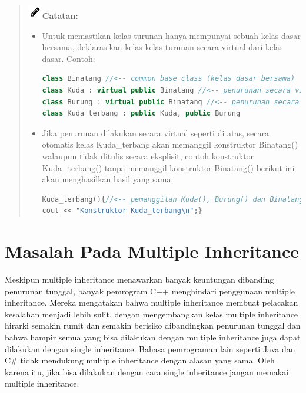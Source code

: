 \begin{quotation}
\includegraphics{../manuscript/images/pencil}\textbf{Catatan:}
	
\begin{itemize}
\item Untuk memastikan kelas turunan hanya mempunyai sebuah kelas dasar bersama,
deklarasikan kelas-kelas turunan secara virtual dari kelas dasar. Contoh:

\begin{lstlisting}[language=c++, numbers=none]
class Binatang //<-- common base class (kelas dasar bersama)
class Kuda : virtual public Binatang //<-- penurunan secara virtual
class Burung : virtual public Binatang //<-- penurunan secara virtual
class Kuda_terbang : public Kuda, public Burung
\end{lstlisting}

\item Jika penurunan dilakukan secara virtual seperti di atas, secara otomatis kelas
Kuda\_terbang akan memanggil konstruktor Binatang() walaupun tidak ditulis
secara eksplisit, contoh konstruktor Kuda\_terbang() tanpa memanggil konstruktor
Binatang() berikut ini akan menghasilkan hasil yang sama:
		
\begin{lstlisting}[language=c++, numbers=none]
Kuda_terbang(){//<-- pemanggilan Kuda(), Burung() dan Binatang() implisit
cout << "Konstruktor Kuda_terbang\n";}
\end{lstlisting}
\end{itemize}

\end{quotation}




\section{Masalah Pada Multiple
Inheritance}\label{masalah-pada-multiple-inheritance}

Meskipun multiple inheritance menawarkan banyak keuntungan dibanding
penurunan tunggal, banyak pemrogram C++ menghindari penggunaan multiple
inheritance. Mereka mengatakan bahwa multiple inheritance membuat
pelacakan kesalahan menjadi lebih sulit, dengan mengembangkan kelas
multiple inheritance hirarki semakin rumit dan semakin berisiko
dibandingkan penurunan tunggal dan bahwa hampir semua yang bisa
dilakukan dengan multiple inheritance juga dapat dilakukan dengan single
inheritance. Bahasa pemrograman lain seperti Java dan C\# tidak
mendukung multiple inheritance dengan alasan yang sama. Oleh karena itu,
jika bisa dilakukan dengan cara single inheritance jangan memakai
multiple inheritance.

